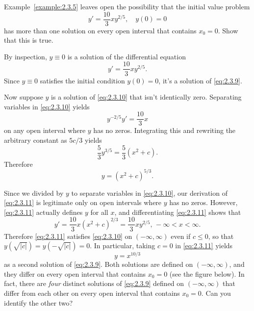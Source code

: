 \documentclass{ximera}
\begin{document}
\begin{example}\label{example:2.3.6}
Example~\ref{example:2.3.5} leaves open the possibility  that the
initial value problem
\begin{equation} \label{eq:2.3.9}
y'=\frac{10}{3}xy^{2/5}, \quad y(0)=0
\end{equation}
has more than one solution on every open interval that contains $x_0=0$.  Show
that this is true.

\begin{explanation}
By inspection, $y\equiv0$ is a solution of the
differential equation
\begin{equation} \label{eq:2.3.10}
y'=\frac{10}{3} xy ^{2/5}.
\end{equation}
 Since $y\equiv0$ satisfies the initial condition $y(0)=0$,
it's a solution of \eqref{eq:2.3.9}.

Now suppose  $y$ is a solution of \eqref{eq:2.3.10} that isn't
identically zero.
 Separating variables in \eqref{eq:2.3.10} yields
$$
 y^{-2/5}y'=\frac{10}{3}x
$$
on any open interval where $y$ has no zeros.
 Integrating this and rewriting the arbitrary constant as $5c/3$ yields
$$
\frac{5}{3}y^{3/5} = \frac{5}{3}(x^2+c).
$$
Therefore
\begin{equation} \label{eq:2.3.11}
y = (x^2+c)^{5/3}.
\end{equation}

Since we divided by $y$ to separate variables in \eqref{eq:2.3.10}, our
derivation of \eqref{eq:2.3.11} is legitimate only on open intervals where $y$
has no zeros. However, \eqref{eq:2.3.11} actually defines $y$ for all $x$,
and differentiating \eqref{eq:2.3.11} shows that
$$
y'=\frac{10}{3}x(x^2+c)^{2/3}=\frac{10}{3}xy^{2/5},\,-\infty<x<\infty.
$$
Therefore \eqref{eq:2.3.11} satisfies \eqref{eq:2.3.10} on
$(-\infty,\infty)$
even if $c\le 0$, so that $y(\sqrt{|c|})=y(-\sqrt{|c|})=0$. In
particular, taking $c=0$ in \eqref{eq:2.3.11} yields
$$
y=x^{10/3}
$$
as a second solution of \eqref{eq:2.3.9}.
 Both solutions are defined on
$(-\infty,\infty)$, and they differ on every
open interval that contains $x_0=0$ (see the figure below).
In fact, there are \textit{four} distinct solutions of
\eqref{eq:2.3.9}  defined on $(-\infty,\infty)$ that differ
from each other on every open interval that contains $x_0=0$.
  Can you identify the other two?

\begin{center}
\end{center}

\end{explanation}
\end{example}
\end{document}
